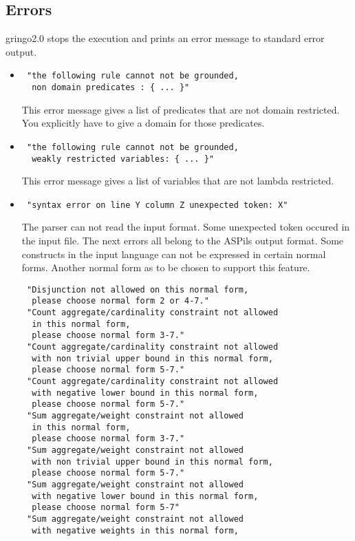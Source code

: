 \documentclass[a4paper,10pt]{article}
\begin{document}
\subsection{Errors}
gringo2.0 stops the execution and prints an error message to standard error output.
\begin{itemize}
 \item 
\begin{verbatim}
 "the following rule cannot not be grounded,
  non domain predicates : { ... }"
\end{verbatim}
This error message gives a list of predicates that are not domain restricted.
You explicitly have to give a domain for those predicates.
 \item 
\begin{verbatim}
 "the following rule cannot not be grounded,
  weakly restricted variables: { ... }"
\end{verbatim}
This error message gives a list of variables that are not lambda restricted. 
\item
\begin{verbatim}
 "syntax error on line Y column Z unexpected token: X"
\end{verbatim}
The parser can not read the input format. Some unexpected token occured in the input file.
\newline
\newline
The next errors all belong to the ASPils output format.
Some constructs in the input language can not be expressed in certain normal forms.
Another normal form as to be chosen to support this feature.
\begin{verbatim}
 "Disjunction not allowed on this normal form,
  please choose normal form 2 or 4-7."
 "Count aggregate/cardinality constraint not allowed
  in this normal form,
  please choose normal form 3-7."
 "Count aggregate/cardinality constraint not allowed 
  with non trivial upper bound in this normal form,
  please choose normal form 5-7."
 "Count aggregate/cardinality constraint not allowed 
  with negative lower bound in this normal form,
  please choose normal form 5-7."
 "Sum aggregate/weight constraint not allowed
  in this normal form,
  please choose normal form 3-7."
 "Sum aggregate/weight constraint not allowed 
  with non trivial upper bound in this normal form,
  please choose normal form 5-7."
 "Sum aggregate/weight constraint not allowed 
  with negative lower bound in this normal form,
  please choose normal form 5-7"
 "Sum aggregate/weight constraint not allowed
  with negative weights in this normal form,

\end{verbatim}
\end{itemize}
\end{document}
